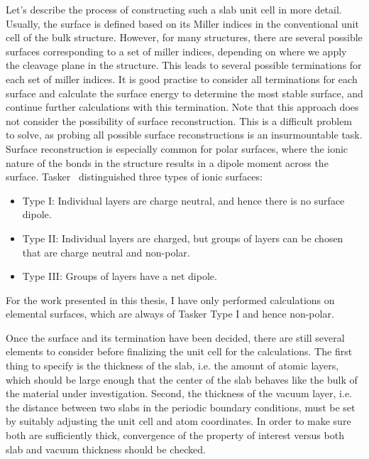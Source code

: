 \begin{refsection}
Let's describe the process of constructing such a slab unit cell in more 
detail. Usually, the surface is defined based on its Miller indices in the 
conventional unit cell of the bulk structure. However, for many structures, 
there are several possible surfaces corresponding to a set of miller indices, 
depending on where we apply the cleavage plane in the structure. This leads to 
several possible terminations for each set of miller indices. It is good 
practise to consider all terminations for each surface and calculate the 
surface energy to determine the most stable surface, and continue further 
calculations with this termination. Note that this approach does not consider 
the possibility of surface reconstruction. This is a difficult problem to 
solve, as probing all possible surface reconstructions is an insurmountable 
task. Surface reconstruction is especially common for polar surfaces, where 
the ionic nature of the bonds in the structure results in a dipole 
moment across the surface. Tasker~\cite{Tasker1979} distinguished three types 
of ionic surfaces: 
\begin{itemize} 
\item Type I: Individual layers are charge neutral, and hence there is no 
surface dipole. 
\item Type II: Individual layers are charged, but groups of layers can be 
chosen that are charge neutral and non-polar. 
\item Type III: Groups of layers have a net dipole. 
\end{itemize} 
For the work presented in this thesis, I have only performed calculations on 
elemental surfaces, which are always of Tasker Type I and hence non-polar. 
 
Once the surface and its termination have been decided, there are still 
several elements to consider before finalizing the unit cell for the 
calculations. The first thing to specify is the thickness of the slab, i.e. 
the amount of atomic layers, which should be large enough that the center of 
the slab behaves like the bulk of the material under investigation. Second, 
the thickness of the vacuum layer, i.e. the distance between two slabs in the 
periodic boundary conditions, must be set by suitably adjusting the unit cell 
and atom coordinates. In order to make sure both are sufficiently thick, 
convergence of the property of interest versus both slab and vacuum thickness 
should be checked. 
 

\end{refsection}
